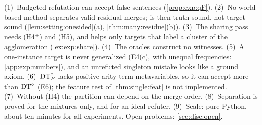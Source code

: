(1)~Budgeted refutation can accept false sentences (\cref{prop:exp:qF}). (2)~No world-based method separates valid residual merges; \DTRC{} is then truth-sound, not target-sound (\cref{lem:setting:onesided}(a), \cref{thm:many:residue}(b)). (3)~The sharing pass needs (H4$^+$) and (H5), and helps only targets that label a cluster of the agglomeration (\cref{ex:exp:share}). (4)~The oracles construct no witnesses. (5)~A one-instance target is never generalized (E4(c), with unequal frequencies: \cref{app:exp:numbers}), and an unrefuted singleton mistake looks like a ground axiom. (6)~$\mathrm{DT}^{\circ}_{F}$ lacks positive-arity term metavariables, so it can accept more than $\mathrm{DT}^{\circ}$ (E6); the feature test of \cref{thm:single:feat} is not implemented. (7)~Without (H4) the partition can depend on the merge order. (8)~Separation is proved for the mixtures only, and for an ideal refuter. (9)~Scale: pure Python, about ten minutes for all experiments. Open problems: \cref{sec:disc:open}.
